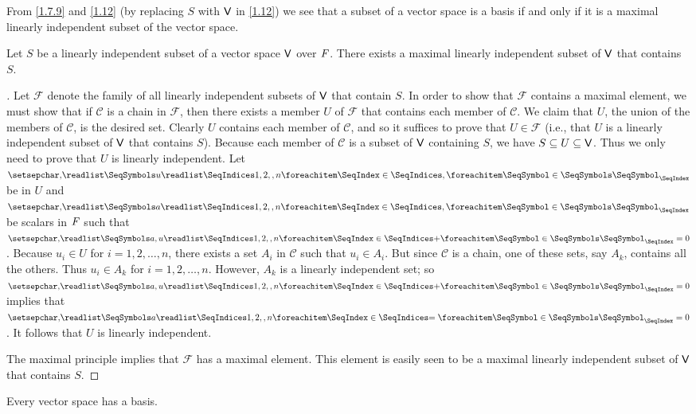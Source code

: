 \begin{note}
  From \cref{1.7.9} and \cref{1.12} (by replacing \(S\) with \(\mathsf{V}\) in \cref{1.12}) we see that a subset of a vector space is a basis if and only if it is a maximal linearly independent subset of the vector space.
\end{note}

\begin{thm}\label{1.13}
  Let \(S\) be a linearly independent subset of a vector space \(\mathsf{V}\) over \(\mathit{F}\).
  There exists a maximal linearly independent subset of \(\mathsf{V}\) that contains \(S\).
\end{thm}

\begin{proof}[]
  Let \(\mathcal{F}\) denote the family of all linearly independent subsets of \(\mathsf{V}\) that contain \(S\).
  In order to show that \(\mathcal{F}\) contains a maximal element, we must show that if \(\mathcal{C}\) is a chain in \(\mathcal{F}\), then there exists a member \(U\) of \(\mathcal{F}\) that contains each member of \(\mathcal{C}\).
  We claim that \(U\), the union of the members of \(\mathcal{C}\), is the desired set.
  Clearly \(U\) contains each member of \(\mathcal{C}\), and so it suffices to prove that \(U \in \mathcal{F}\)
  (i.e., that \(U\) is a linearly independent subset of \(\mathsf{V}\) that contains \(S\)).
  Because each member of \(\mathcal{C}\) is a subset of \(\mathsf{V}\) containing \(S\), we have \(S \subseteq U \subseteq \mathsf{V}\).
  Thus we only need to prove that \(U\) is linearly independent.
  Let \(\seq{u}{1,2,,n}\) be in \(U\) and \(\seq{a}{1,2,,n}\) be scalars in \(\mathit{F}\) such that \(\seq[+]{a,u}{1,2,,n} = 0\).
  Because \(u_i \in U\) for \(i = 1, 2, \dots, n\), there exists a set \(A_i\) in \(\mathcal{C}\) such that \(u_i \in A_i\).
  But since \(\mathcal{C}\) is a chain, one of these sets, say \(A_k\), contains all the others.
  Thus \(u_i \in A_k\) for \(i = 1, 2, \dots, n\).
  However, \(A_k\) is a linearly independent set;
  so \(\seq[+]{a,u}{1,2,,n} = 0\) implies that \(\seq[=]{a}{1,2,,n} = 0\).
  It follows that \(U\) is linearly independent.

  The maximal principle implies that \(\mathcal{F}\) has a maximal element.
  This element is easily seen to be a maximal linearly independent subset of \(\mathsf{V}\) that contains \(S\).
\end{proof}

\begin{cor}\label{1.7.10}
  Every vector space has a basis.
\end{cor}

